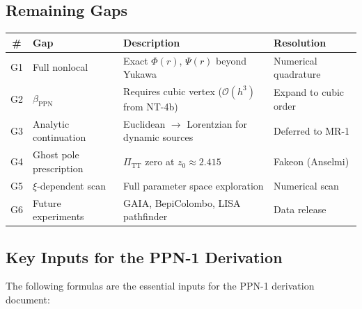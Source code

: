 \documentclass[11pt,a4paper]{article}
\theoremstyle{plain}
\theoremstyle{definition}
\theoremstyle{remark}
\begin{document}
\subsection{Remaining Gaps}

\begin{center}
\begin{tabular}{clp{5cm}l}
\toprule
\# & Gap & Description & Resolution \\
\midrule
G1 & Full nonlocal & Exact $\Phi(r)$, $\Psi(r)$ beyond Yukawa &
  Numerical quadrature \\
G2 & $\beta_{\mathrm{PPN}}$ & Requires cubic vertex
  ($\mathcal{O}(h^3)$ from NT-4b) &
  Expand to cubic order \\
G3 & Analytic continuation & Euclidean $\to$ Lorentzian for
  dynamic sources &
  Deferred to MR-1 \\
G4 & Ghost pole prescription & $\Pi_{\mathrm{TT}}$ zero at
  $z_0 \approx 2.415$ &
  Fakeon (Anselmi) \\
G5 & $\xi$-dependent scan & Full parameter space exploration &
  Numerical scan \\
G6 & Future experiments & GAIA, BepiColombo, LISA pathfinder &
  Data release \\
\bottomrule
\end{tabular}
\end{center}

\subsection{Key Inputs for the PPN-1 Derivation}

The following formulas are the essential inputs for the PPN-1
derivation document:
\end{document}
